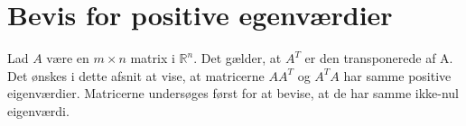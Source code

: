 \chapter{Bevis for positive egenværdier}\label{app:eigenvalues}
Lad $A$ være en $m \times n$ matrix i $\mathbb{R}^n$. Det gælder, at $A^T$ er den transponerede af A.
Det ønskes i dette afsnit at vise, at matricerne $AA^T$ og $A^TA$ har samme positive eigenværdier. Matricerne undersøges først for at bevise, at de har samme ikke-nul eigenværdi.

